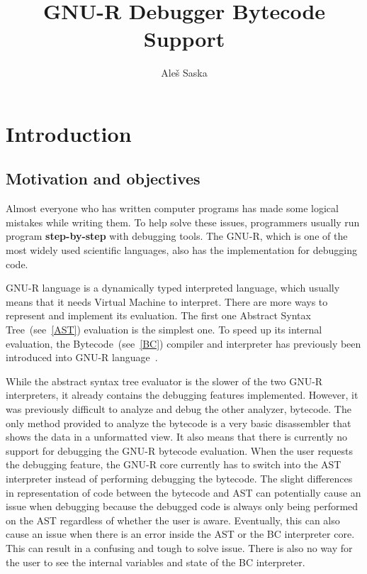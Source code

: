 \documentclass[thesis=M,english]{FITthesis}[2018/10/20]
\title{GNU-R Debugger Bytecode Support}
\author{Ale{\v s} Saska} %
\begin{document}


\chapter{Introduction}\label{introduction}

\section{Motivation and objectives}\label{motivation-and-objectives}

Almost everyone who has written computer programs has made some logical mistakes while writing them. To help solve these issues, programmers usually run program \textbf{step-by-step} with debugging tools. The \mbox{GNU-R}, which is one of the most widely used scientific languages, also has the implementation for debugging code.

GNU-R language is a dynamically typed interpreted language, which usually means that it needs Virtual Machine to interpret. There are more ways to represent and implement its evaluation. The first one Abstract Syntax Tree~(see~\ref{AST}) evaluation is the simplest one. To speed up its internal evaluation, the Bytecode~(see~\ref{BC}) compiler and interpreter has previously been introduced into \mbox{GNU-R} language~\cite{r-compiler-some-first-experiments}.

While the abstract syntax tree evaluator is the slower of the two GNU-R interpreters, it already contains the debugging features implemented. However, it was previously difficult to analyze and debug the other analyzer, bytecode. The only method provided to analyze the bytecode is a very basic disassembler that shows the data in a unformatted view. It also means that there is currently no support for debugging the GNU-R bytecode evaluation. When the user requests the debugging feature, the GNU-R core currently has to switch into the AST interpreter instead of performing debugging the bytecode. The slight differences in representation of code between the bytecode and AST can potentially cause an issue when debugging because the debugged code is always only being performed on the AST regardless of whether the user is aware. Eventually, this can also cause an issue when there is an error inside the AST or the BC interpreter core. This can result in a confusing and tough to solve issue. There is also no way for the user to see the internal variables and state of the BC interpreter.
\end{document}
